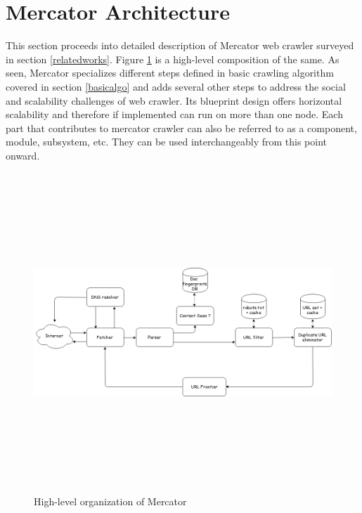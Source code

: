 \section{Mercator Architecture}\label{blueprint}
This section proceeds into detailed description of Mercator\cite{mercator} web crawler surveyed in section \ref{relatedworks}. Figure \ref{fig:basicarch} is a high-level composition of the same. As seen, Mercator specializes different steps defined in basic crawling
algorithm covered in section \ref{basicalgo} and adds several other steps to address
the social and scalability challenges of web crawler. Its blueprint design offers
horizontal scalability and therefore if implemented can run on more than one node.
Each part that contributes to mercator crawler can also be referred to as a
component, module, subsystem, etc. They can be used interchangeably from this point onward.

\begin{figure}[h!]
  \centering
  \includegraphics[width=15cm,height=12cm,keepaspectratio]{../media/crawler/basic-crawler-architecture-v2.png}
  \caption{High-level organization of Mercator}
  \label{fig:basicarch}
\end{figure}

